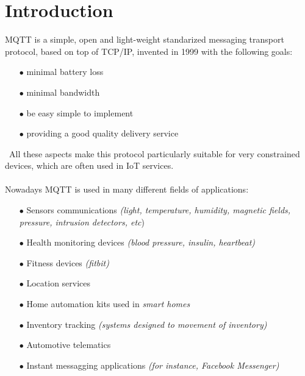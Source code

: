 \documentclass[12pt]{report}
\begin{document}
\section{Introduction}
\bigskip
\textsc{MQTT} is a simple, open and light-weight standarized messaging transport protocol, based on top of TCP/IP, invented in 1999 with the following goals:


\begin{itemize}
\setlength{\itemindent}{+4mm}
  \item[$\bullet$] minimal battery loss
  \item[$\bullet$] minimal bandwidth
  \item[$\bullet$] be easy simple to implement
  \item[$\bullet$] providing a good quality delivery service
\end{itemize}\
All these aspects make this protocol particularly suitable for very constrained devices, which are often used in IoT services.\\\\
Nowadays MQTT is used in many different fields of applications:

 \begin{itemize}
 \setlength{\itemindent}{+4mm}
  \item[$\bullet$] Sensors communications \emph{(light, temperature, humidity, magnetic fields, pressure, intrusion detectors, etc})
  \item[$\bullet$] Health monitoring devices \emph{(blood pressure, insulin, heartbeat)}
  \item[$\bullet$] Fitness devices\emph{ (fitbit)}
  \item[$\bullet$] Location services
  \item[$\bullet$] Home automation kits used in \emph{smart homes}
  \item[$\bullet$] Inventory tracking \emph{(systems designed to movement of inventory)}
  \item[$\bullet$] Automotive telematics
  \item[$\bullet$] Instant messagging applications \emph{(for instance, Facebook Messenger)}
\end{itemize}\

\end{document}
